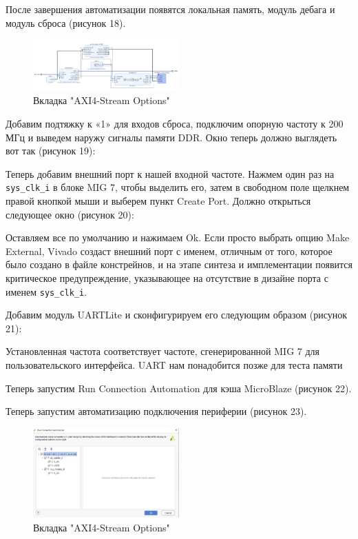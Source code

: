 \documentclass[a4paper,oneside ,10pt]{extreport}
\begin{document}
После завершения автоматизации появятся локальная память, модуль дебага и модуль сброса (рисунок 18).
\begin{figure}[h]
	\centering
	\includegraphics[width=0.5\textwidth]{image/mig_m_1.png}
	\caption{Вкладка "AXI4-Stream Options"}
	\label{mig_m_1}
\end{figure}

Добавим подтяжку к «1» для входов сброса, подключим опорную частоту к 200 МГц и выведем наружу сигналы памяти DDR. Окно теперь должно выглядеть вот так (рисунок 19):

Теперь добавим внешний порт к нашей входной частоте. Нажмем один раз на \verb|sys_clk_i| в блоке MIG 7, чтобы выделить его, затем в свободном поле щелкнем правой кнопкой мыши и выберем пункт Create Port. Должно открыться следующее окно (рисунок 20):

Оставляем все по умолчанию и нажимаем Ok. Если просто выбрать опцию Make External, Vivado создаст внешний порт с именем, отличным от того, которое было создано в файле констрейнов, и на этапе синтеза и имплементации появится критическое предупреждение, указывающее на отсутствие в дизайне порта с именем \verb|sys_clk_i|.

Добавим модуль UARTLite и сконфигурируем его следующим образом (рисунок 21):

    Установленная частота соответствует частоте, сгенерированной MIG 7 для пользовательского интерфейса. UART нам понадобится позже для теста памяти

    Теперь запустим Run Connection Automation для кэша MicroBlaze (рисунок 22).

    Теперь запустим автоматизацию подключения периферии (рисунок 23).
\begin{figure}[h]
	\centering
	\includegraphics[width=0.5\textwidth]{image/mig_m_3.png}
	\caption{Вкладка "AXI4-Stream Options"}
	\label{mig_m_3}
\end{figure}
\end{document}
